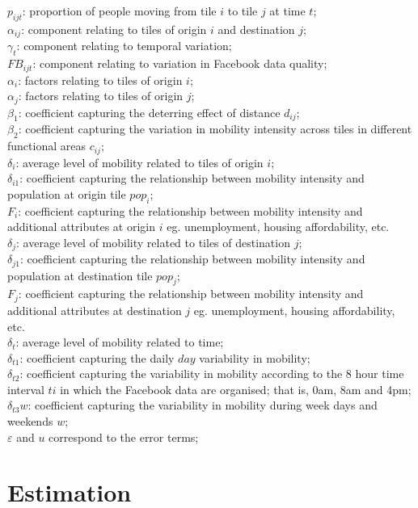 \documentclass[11pt,letterpaper]{article}
\begin{document}
$p_{ijt}$: proportion of people moving from tile $i$ to tile $j$ at time $t$;\\
$\alpha_{ij}$: component relating to tiles of origin $i$ and destination $j$;\\
$\gamma_{t}$: component relating to temporal variation;\\
$FB_{ijt}$: component relating to variation in Facebook data quality;\\
$\alpha_{i}$: factors relating to tiles of origin $i$;\\
$\alpha_{j}$: factors relating to tiles of origin $j$;\\
$\beta_{1}$: coefficient capturing the deterring effect of distance $d_{ij}$;\\
$\beta_{2}$: coefficient capturing the variation in mobility intensity across tiles in different functional areas $c_{ij}$;\\
$\delta_{i}$: average level of mobility related to tiles of origin $i$;\\
$\delta_{i1}$: coefficient capturing the relationship between mobility intensity and population at origin tile $pop_{i}$;\\
$F_{i}$: coefficient capturing the relationship between mobility intensity and additional attributes at origin $i$ eg. unemployment, housing affordability, etc.\\ 
$\delta_{j}$: average level of mobility related to tiles of destination $j$;\\
$\delta_{j1}$: coefficient capturing the relationship between mobility intensity and population at destination tile $pop_{j}$;\\
$F_{j}$: coefficient capturing the relationship between mobility intensity and additional attributes at destination $j$ eg. unemployment, housing affordability, etc.\\ 
$\delta_{t}$: average level of mobility related to time;\\
$\delta_{t1}$: coefficient capturing the daily $day$ variability in mobility;\\
$\delta_{t2}$: coefficient capturing the variability in mobility according to the 8 hour time interval $ti$ in which the Facebook data are organised; that is, 0am, 8am and 4pm;\\
$\delta_{t3}w$: coefficient capturing the variability in mobility during week days and weekends $w$;\\
$\varepsilon$ and $u$ correspond to the error terms;

\section*{Estimation}
\end{document}
